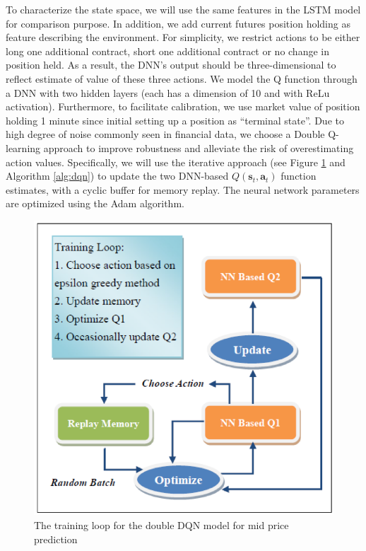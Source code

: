 \documentclass{article}
\begin{document}
To characterize the state space, we will use the same features in the LSTM model for comparison purpose. In addition, we add current futures position holding as feature describing the environment. For simplicity, we restrict actions to be either long one additional contract, short one additional contract or no change in position held. As a result, the DNN’s output should be three-dimensional to reflect estimate of value of these three actions. We model the Q function through a DNN with two hidden layers (each has a dimension of 10 and with ReLu activation). Furthermore, to facilitate calibration, we use market value of position holding 1 minute since initial setting up a position as “terminal state”. Due to high degree of noise commonly seen in financial data, we choose a Double Q-learning approach to improve robustness and alleviate the risk of overestimating action values. Specifically, we will use the iterative approach (see Figure \ref{fig:rl_loop} and Algorithm \ref{alg:dqn}) to update the two DNN-based $Q(\mathbf{s}_t, \mathbf{a}_t)$ function estimates, with a cyclic buffer for memory replay. The neural network parameters are optimized using the Adam algorithm.
\begin{figure}[h]
	\includegraphics[width=\linewidth]{rl_loop.png}
	\caption{The training loop for the double DQN model for mid price prediction}
	\label{fig:rl_loop}
\end{figure}
\end{document}
